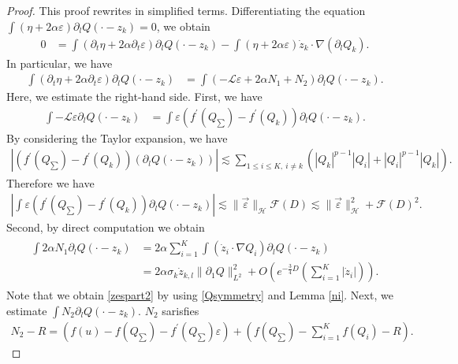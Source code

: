 \documentclass[reqno]{amsart}
\theoremstyle{plain}
\theoremstyle{definition}
\numberwithin{equation}{section}
\newcommand{\1}{\mathbbm{1}}
\begin{document}
\begin{proof}
This proof rewrites \cite[Section3, Section4]{IN} in simplified terms. Differentiating the equation $\int (\eta+2\alpha\varepsilon){\partial}_lQ(\cdot-z_k)=0$, we obtain
\begin{align*}
0&=\int({\partial}_t\eta+2\alpha {\partial}_t\varepsilon){\partial}_lQ(\cdot-z_k)-\int(\eta+2\alpha\varepsilon)\dot{z}_k\cdot \nabla({\partial}_lQ_k).
\end{align*}
In particular, we have
\begin{align*}
\int ({\partial}_t\eta+2\alpha {\partial}_t\varepsilon){\partial}_lQ(\cdot-z_k)&=\int (-\mathcal{L}\varepsilon+2\alpha N_1+N_2){\partial}_lQ(\cdot-z_k).
\end{align*}
Here, we estimate the right-hand side. First, we have
\begin{align*}
\int-\mathcal{L}\varepsilon{\partial}_lQ(\cdot-z_k)&=\int \varepsilon (f^{\prime}(Q_{\sum})-f^{\prime}(Q_k)){\partial}_lQ(\cdot-z_k). 
\end{align*}
By considering the Taylor expansion, we have
\begin{align*}
\left| (f^{\prime}(Q_{\sum})-f^{\prime}(Q_k))({\partial}_lQ(\cdot-z_k))\right|\lesssim \sum_{1\leq i\leq K,\ i\neq k}(|Q_k|^{p-1}|Q_i|+|Q_i|^{p-1}|Q_k|).
\end{align*}
Therefore we have
\begin{align}\label{zespart1}
\left|\int \varepsilon (f^{\prime}(Q_{\sum})-f^{\prime}(Q_k)){\partial}_lQ(\cdot-z_k)\right|\lesssim \|\vec{\varepsilon}\|_{\mathcal{H}}\mathcal{F}(D)\lesssim \|\vec{\varepsilon}\|_{\mathcal{H}}^2+\mathcal{F}(D)^2.
\end{align}
Second, by direct computation we obtain
\begin{align}\label{zespart2}
\begin{aligned}
\int 2\alpha N_1{\partial}_lQ(\cdot-z_k)&=2\alpha \sum_{i=1}^K \int  (\dot{z}_i\cdot \nabla Q_i){\partial}_lQ(\cdot-z_k)
\\
&=2\alpha \sigma_k \dot{z}_{k,l}\|{\partial}_1Q\|_{L^2}^2+O\left(e^{-\frac{3}{4}D} \left(\sum_{i=1}^K|\dot{z}_i|\right)\right).
\end{aligned}
\end{align}
Note that we obtain \eqref{zespart2} by using \eqref{Qsymmetry} and Lemma \ref{ni}. Next, we estimate $\int N_2{\partial}_lQ(\cdot-z_k)$. $N_2$ sarisfies
\begin{align*}
N_2-R=(f(u)-f(Q_{\sum})-f^{\prime}(Q_{\sum})\varepsilon)+\left(f(Q_{\sum})-\sum_{i=1}^Kf(Q_i)-R\right).

\end{align*}
\end{proof}
\end{document}
